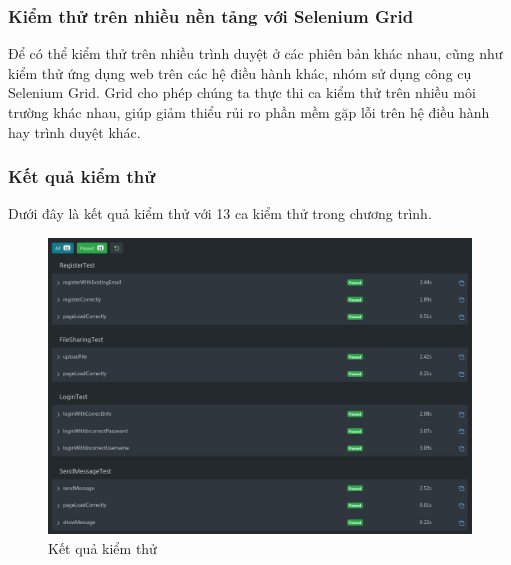 \documentclass[./../main_file.tex]{subfiles}
\begin{document}
	\subsubsection{Kiểm thử trên nhiều nền tảng với Selenium Grid}

	Để có thể kiểm thử trên nhiều trình duyệt ở các phiên bản khác nhau, cũng như kiểm thử ứng dụng web trên các hệ điều hành khác, nhóm sử dụng công cụ Selenium Grid. Grid cho phép chúng ta thực thi ca kiểm thử trên nhiều môi trường khác nhau, giúp giảm thiểu rủi ro phần mềm gặp lỗi trên hệ điều hành hay trình duyệt khác.
	
	\subsubsection{Kết quả kiểm thử}
	
	Dưới đây là kết quả kiểm thử với 13 ca kiểm thử trong chương trình.
	
	\begin{figure}[H]
		\centering
		\includegraphics[width=\linewidth]{./images/image6.png}
		\caption{Kết quả kiểm thử}
	\end{figure}
\end{document}
